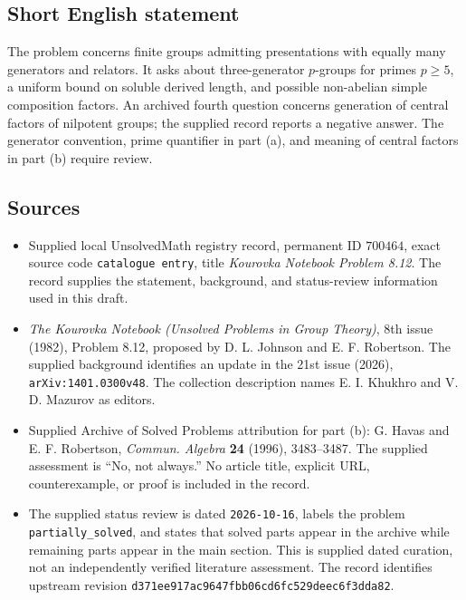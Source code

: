 \documentclass[11pt]{article}
\begin{document}
\subsection{Short English statement}
The problem concerns finite groups admitting presentations with equally many generators and relators. It asks about three-generator \(p\)-groups for primes \(p\geq 5\), a uniform bound on soluble derived length, and possible non-abelian simple composition factors. An archived fourth question concerns generation of central factors of nilpotent groups; the supplied record reports a negative answer. The generator convention, prime quantifier in part (a), and meaning of central factors in part (b) require review.
\subsection{Sources}
\begin{itemize}
\item Supplied local UnsolvedMath registry record, permanent ID \(700464\), exact source code \texttt{catalogue entry}, title \emph{Kourovka Notebook Problem 8.12}. The record supplies the statement, background, and status-review information used in this draft.
\item \emph{The Kourovka Notebook (Unsolved Problems in Group Theory)}, 8th issue (1982), Problem 8.12, proposed by D. L. Johnson and E. F. Robertson. The supplied background identifies an update in the 21st issue (2026), \texttt{arXiv:1401.0300v48}. The collection description names E. I. Khukhro and V. D. Mazurov as editors.
\item Supplied Archive of Solved Problems attribution for part (b): G. Havas and E. F. Robertson, \emph{Commun. Algebra} \textbf{24} (1996), 3483--3487. The supplied assessment is ``No, not always.'' No article title, explicit URL, counterexample, or proof is included in the record.
\item The supplied status review is dated \texttt{2026-10-16}, labels the problem \texttt{partially\_solved}, and states that solved parts appear in the archive while remaining parts appear in the main section. This is supplied dated curation, not an independently verified literature assessment. The record identifies upstream revision \texttt{d371ee917ac9647fbb06cd6fc529deec6f3dda82}.
\end{itemize}
\end{document}
